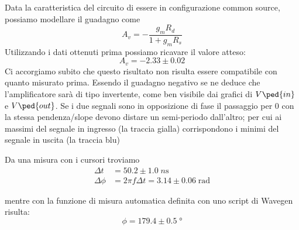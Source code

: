 \documentclass[10pt, a4paper, italian]{article}
\begin{document}
Data la caratteristica del circuito di essere in configurazione common source, possiamo modellare il guadagno come
\begin{equation}
A_v = -\frac{g_m R_d}{1+g_mR_s}
\end{equation}
Utilizzando i dati ottenuti prima possiamo ricavare il valore atteso:
\[
A_v = -2.33 \pm 0.02
\]
Ci accorgiamo subito che questo risultato non risulta essere compatibile con quanto misurato prima.
Essendo il guadagno negativo se ne deduce che l'amplificatore sarà di tipo invertente, come ben visibile dai grafici di $V\ped{in}$ e $V\ped{out}$.
Se i due segnali sono in opposizione di fase il passaggio per 0 con la stessa
pendenza/slope devono distare un semi-periodo dall'altro; per cui ai massimi
del segnale in ingresso (la traccia gialla) corrispondono i minimi del segnale
in uscita (la traccia blu)

Da una misura con i cursori troviamo
\begin{align*}
\Delta t &= 50.2 \pm 1.0 \; \si{n\s} \\
\Delta \phi &= 2\pi f \Delta t = 3.14 \pm 0.06 \; \si{\radian}
\end{align*}

mentre con la funzione di misura automatica definita con uno script di Wavegen
risulta:
\[
\phi = 179.4 \pm 0.5 \; \si{\degree}
\]
\end{document}
